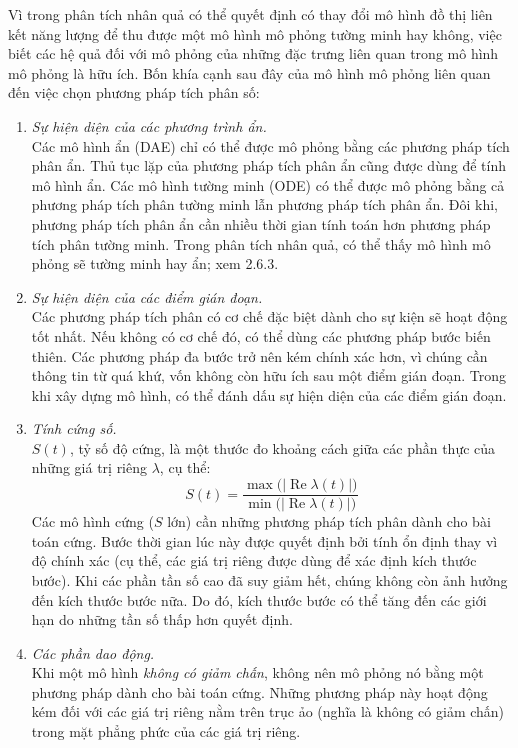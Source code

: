 Vì trong phân tích nhân quả có thể quyết định có thay đổi mô hình đồ thị liên kết năng lượng để thu được một mô hình mô phỏng tường minh hay không, việc biết các hệ quả đối với mô phỏng của những đặc trưng liên quan trong mô hình mô phỏng là hữu ích. Bốn khía cạnh sau đây của mô hình mô phỏng liên quan đến việc chọn phương pháp tích phân số:
\begin{enumerate}
\item \emph{Sự hiện diện của các phương trình ẩn.}\\
Các mô hình ẩn (DAE) chỉ có thể được mô phỏng bằng các phương pháp tích phân ẩn. Thủ tục lặp của phương pháp tích phân ẩn cũng được dùng để tính mô hình ẩn. Các mô hình tường minh (ODE) có thể được mô phỏng bằng cả phương pháp tích phân tường minh lẫn phương pháp tích phân ẩn. Đôi khi, phương pháp tích phân ẩn cần nhiều thời gian tính toán hơn phương pháp tích phân tường minh. Trong phân tích nhân quả, có thể thấy mô hình mô phỏng sẽ tường minh hay ẩn; xem 2.6.3.
\item \emph{Sự hiện diện của các điểm gián đoạn.}\\
Các phương pháp tích phân có cơ chế đặc biệt dành cho sự kiện sẽ hoạt động tốt nhất. Nếu không có cơ chế đó, có thể dùng các phương pháp bước biến thiên. Các phương pháp đa bước trở nên kém chính xác hơn, vì chúng cần thông tin từ quá khứ, vốn không còn hữu ích sau một điểm gián đoạn. Trong khi xây dựng mô hình, có thể đánh dấu sự hiện diện của các điểm gián đoạn.
\item \emph{Tính cứng số.}\\
$S(t)$, tỷ số độ cứng, là một thước đo khoảng cách giữa các phần thực của những giá trị riêng $\lambda$, cụ thể:
\[S(t)=\frac{\max\bigl(\lvert\operatorname{Re}\lambda(t)\rvert\bigr)}{\min\bigl(\lvert\operatorname{Re}\lambda(t)\rvert\bigr)}\]
Các mô hình cứng ($S$ lớn) cần những phương pháp tích phân dành cho bài toán cứng. Bước thời gian lúc này được quyết định bởi tính ổn định thay vì độ chính xác (cụ thể, các giá trị riêng được dùng để xác định kích thước bước). Khi các phần tần số cao đã suy giảm hết, chúng không còn ảnh hưởng đến kích thước bước nữa. Do đó, kích thước bước có thể tăng đến các giới hạn do những tần số thấp hơn quyết định.
\item \emph{Các phần dao động.}\\
Khi một mô hình \emph{không có giảm chấn}, không nên mô phỏng nó bằng một phương pháp dành cho bài toán cứng. Những phương pháp này hoạt động kém đối với các giá trị riêng nằm trên trục ảo (nghĩa là không có giảm chấn) trong mặt phẳng phức của các giá trị riêng.
\end{enumerate}


